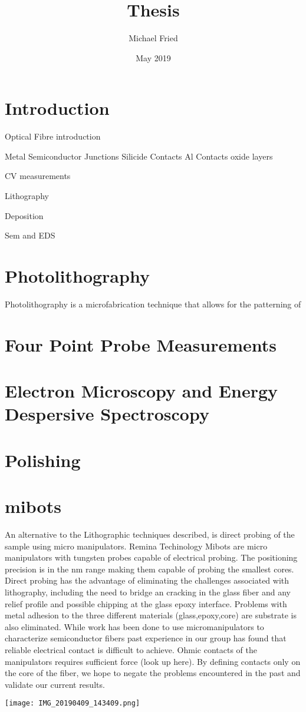 \documentclass{article}
\title{Thesis}
\author{Michael Fried }
\date{May 2019}
\begin{document}
\maketitle

\section{Introduction}
Optical Fibre introduction

Metal Semiconductor Junctions 
    Silicide Contacts
    Al Contacts
    oxide layers
    

    
CV measurements 

Lithography

Deposition

Sem and EDS
\section{Photolithography}
Photolithography is a microfabrication technique that allows for the patterning of 

\section{Four Point Probe Measurements}

\section{Electron Microscopy and Energy Despersive Spectroscopy}

\section{Polishing}

\section{mibots}
An alternative to the Lithographic techniques described, is direct probing of the sample using micro manipulators. Remina Techinology Mibots are micro manipulators with tungsten probes capable of electrical probing. The positioning precision is in the nm range making them capable of probing the smallest cores. Direct probing has the advantage of eliminating the challenges associated with lithography, including the need to bridge an cracking in the glass fiber and any relief profile and possible chipping at the glass epoxy interface. Problems with metal adhesion to the three different materials (glass,epoxy,core) are substrate is also eliminated. While work has been done to use micromanipulators to characterize semiconductor fibers \cite{Engel2016DirectPhotosynthesis} past experience in our group has found that reliable electrical contact is difficult to achieve. Ohmic contacts of the manipulators requires sufficient force (look up here). By defining contacts only on the core of the fiber, we hope to negate the problems encountered in the past and validate our current results. 

\texttt{[image: IMG\_20190409\_143409.png]}
\end{document}
